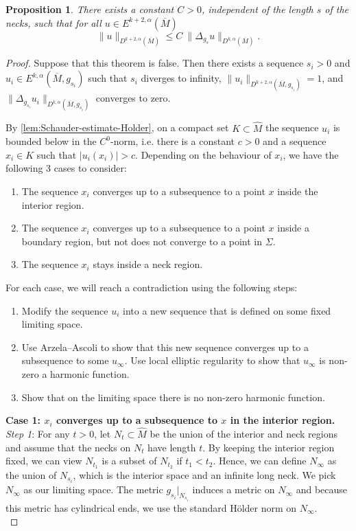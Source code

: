 \documentclass[preprint,12pt]{elsarticle}
\numberwithin{table}{section}
\newtheorem{proposition}[lemma]{Proposition}
\begin{document}
\begin{proposition}
	\label{prop:bounded-inverse}
	There exists a constant $C > 0$, independent of the length $s$ of the necks, such that for all $u \in E^{k+2, \alpha}(\overline{M})$
	$$
	\|u\|_{D^{k+2, \alpha}(\overline{M})} \le C \:
		\| \Delta_{g_s} u\|_{D^{k, \alpha}(\overline{M})}.
	$$
\end{proposition}
\begin{proof}
	Suppose that this theorem is false. Then there exists a sequence $s_i> 0$ and $u_i \in E^{k, \alpha}(\overline{M}, g_{s_i})$ such that $s_i$ diverges to infinity, $\| u_i\|_{D^{k+2, \alpha}(\overline{M}, g_{s_i})} = 1$, and $\|\Delta_{g_{s_i}} u_i\|_{D^{k, \alpha}(\overline{M}, g_{s_i})}$ converges to zero.
	
	By \cref{lem:Schauder-estimate-Holder}, on a compact set $K \subset \hat{M}$ the sequence $u_i$ is bounded below in the $C^0$-norm, i.e. there is a constant $c > 0$ and a sequence $x_i \in K$ such that $|u_i(x_i)| > c$. Depending on the behaviour of $x_i$, we have the following 3 cases to consider:
	\begin{enumerate}
		\item The sequence $x_i$ converges up to a subsequence to a point $x$ inside the interior region.
		\item The sequence $x_i$ converges up to a subsequence to a point $x$ inside a boundary region, but not does not converge to a point in $\Sigma$.
		\item The sequence $x_i$ stays inside a neck region.
	\end{enumerate}
	For each case, we will reach a contradiction using the following steps:
	\begin{enumerate}
		\item Modify the sequence $u_i$ into a new sequence that is defined on some fixed limiting space.
		\item Use Arzela--Ascoli to show that this new sequence converges up to a subsequence to some $u_\infty$. Use local elliptic regularity to show that $u_\infty$ is non-zero a harmonic function.
		\item Show that on the limiting space there is no non-zero harmonic function.
	\end{enumerate}

	\noindent
	\textbf{Case 1: $x_i$ converges up to a subsequence to $x$ in the interior region.} \\
	\textit{Step 1}: For any $t > 0$, let $N_t \subset \hat{M}$ be the union of the interior and neck regions and assume that the necks on $N_t$ have length $t$. By keeping the interior region fixed, we can view $N_{t_1}$ is a subset of $N_{t_2}$ if $t_1 < t_2$. Hence, we can define $N_\infty$ as the union of $N_{s_i}$, which is the interior space and an infinite long neck. We pick $N_\infty$ as our limiting space. The metric $g_{s_i}|_{N_{s_i}}$ induces a metric on $N_\infty$ and because this metric has cylindrical ends, we use the standard H\"older norm on $N_\infty$.
	\\


\end{proof}
\end{document}
